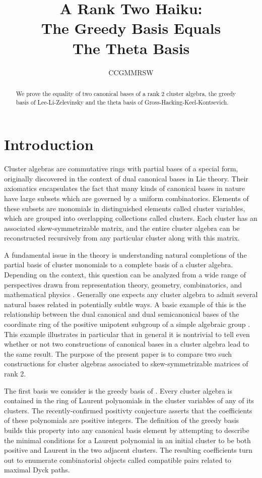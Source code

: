 \documentclass[11pt]{amsart}
\title[Greedy Basis is the Theta Basis]{A Rank Two Haiku:\\ The Greedy Basis Equals \\ The Theta Basis}
\author{CCGMMRSW}
\theoremstyle{remark}
\numberwithin{equation}{section}
\begin{document}
\maketitle

\begin{abstract}
We prove the equality of two canonical bases of a rank 2 cluster algebra, the greedy basis of Lee-Li-Zelevinsky and the theta basis of Gross-Hacking-Keel-Kontsevich.
\end{abstract}

\section{Introduction}

Cluster algebras are commutative rings with partial bases of a special form, originally discovered in the context of dual canonical bases in Lie theory.  Their axiomatics encapsulates the fact that many kinds of canonical bases in nature have large subsets which are governed by a uniform combinatorics.  Elements of these subsets are monomials in distinguished elements called cluster variables, which are grouped into overlapping collections called clusters.  Each cluster has an associated skew-symmetrizable matrix, and the entire cluster algebra can be reconstructed recursively from any particular cluster along with this matrix.

A fundamental issue in the theory is understanding natural completions of the partial basis of cluster monomials to a complete basis of a cluster algebra.  Depending on the context, this question can be analyzed from a wide range of perspectives drawn from representation theory, geometry, combinatorics, and mathematical physics \cite{???}.  Generally one expects any cluster algebra to admit several natural bases related in potentially subtle ways.  A basic example of this is the relationship between the dual canonical and dual semicanonical bases of the coordinate ring of the positive unipotent subgroup of a simple algebraic group \cite{???}.  This example illustrates in particular that in general it is nontrivial to tell even whether or not two constructions of canonical bases in a cluster algebra lead to the same result.  The purpose of the present paper is to compare two such constructions for cluster algebras associated to skew-symmetrizable matrices of rank 2.  

The first basis we consider is the greedy basis of \cite{LLZ}.  Every cluster algebra is contained in the ring of Laurent polynomials in the cluster variables of any of its clusters.  The recently-confirmed positivty conjecture asserts that the coefficients of these polynomials are positive integers.  The definition of the greedy basis builds this property into any canonical basis element by attempting to describe the minimal conditions for a Laurent polynomial in an initial cluster to be both positive and Laurent in the two adjacent clusters.  The resulting coefficients turn out to enumerate combinatorial objects called compatible pairs related to maximal Dyck paths.  
\end{document}
